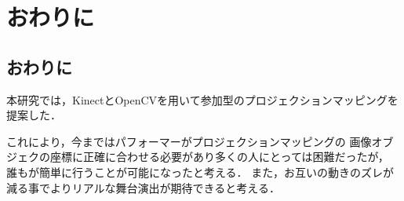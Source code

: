 \chapter{おわりに}
\thispagestyle{fancy}

\section{おわりに}

本研究では，KinectとOpenCVを用いて参加型のプロジェクションマッピングを提案した．

これにより，今まではパフォーマーがプロジェクションマッピングの
画像オブジェクの座標に正確に合わせる必要があり多くの人にとっては困難だったが，
誰もが簡単に行うことが可能になったと考える．
また，お互いの動きのズレが減る事でよりリアルな舞台演出が期待できると考える．

